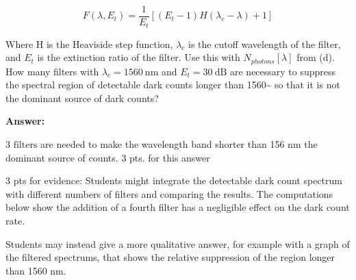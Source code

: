 \documentclass[12pt]{caltech_thesis}
\begin{document}
\begin{enumerate}
  \[F(\lambda, E_t) = \frac{1}{E_t}[(E_t - 1)H(\lambda_c - \lambda) + 1]\]

  Where H is the Heaviside step function, \(\lambda_c\) is the cutoff
  wavelength of the filter, and \(E_t\) is the extinction ratio of the
  filter. Use this with \(N_{photons}[\lambda]\) from (d). How many
  filters with \(\lambda_c = 1560~\text{nm}\) and \(E_t = 30~\text{dB}\)
  are necessary to suppress the spectral region of detectable dark
  counts longer than 1560\textasciitilde{} so that it is not
  the dominant source of dark counts?

  {\color{midnightblue}  \textbf{Answer:} }

  {\color{midnightblue} \(\boxed{\text{3 filters}}\) are needed to make
  the wavelength band shorter than 156 nm the dominant source of
  counts.} {\color{darkred} 3 pts. for this answer}

  {\color{darkred} 3 pts for evidence:} {\color{midnightblue} Students
  might integrate the detectable dark count spectrum with different
  numbers of filters and comparing the results. The computations below
  show the addition of a fourth filter has a negligible effect on the
  dark count rate. }

  {\color{midnightblue} Students may instead give a more qualitative
  answer, for example with a graph of the filtered spectrums, that shows
  the relative suppression of the region longer than 1560 nm. }


\end{enumerate}
\end{document}
